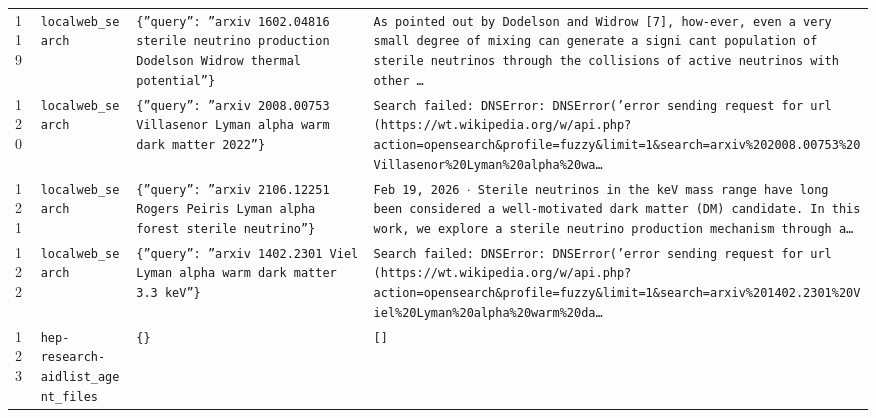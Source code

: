 \documentclass[11pt,a4paper]{article}
\begin{document}
\begin{longtable}{@{}p{}p{}p{}p{}@{}}
119 & \texttt{local}\newline\texttt{web\_\allowbreak{}search} & \texttt{\{''query'':\allowbreak{} ''arxiv 1602.04816 sterile neutrino production Dodelson Widrow thermal potential''\}\allowbreak{}} & \texttt{As pointed out by Dodelson and Widrow [7]\allowbreak{},\allowbreak{} how-ever,\allowbreak{} even a very small degree of mixing can generate a signi cant population of sterile neutrinos through the collisions of active neutrinos with other \ldots{}\allowbreak{}} \\
120 & \texttt{local}\newline\texttt{web\_\allowbreak{}search} & \texttt{\{''query'':\allowbreak{} ''arxiv 2008.00753 Villasenor Lyman alpha warm dark matter 2022''\}\allowbreak{}} & \texttt{Search failed:\allowbreak{} DNSError:\allowbreak{} DNSError('error sending request for url (https:\allowbreak{}/\allowbreak{}/\allowbreak{}wt.wikipedia.org/\allowbreak{}w/\allowbreak{}api.php?action=\allowbreak{}opensearch\&profile=\allowbreak{}fuzzy\&limit=\allowbreak{}1\&search=\allowbreak{}arxiv\%202008.00753\%20Villasenor\%20Lyman\%20alpha\%20wa\ldots{}\allowbreak{}} \\
121 & \texttt{local}\newline\texttt{web\_\allowbreak{}search} & \texttt{\{''query'':\allowbreak{} ''arxiv 2106.12251 Rogers Peiris Lyman alpha forest sterile neutrino''\}\allowbreak{}} & \texttt{Feb 19,\allowbreak{} 2026 $\cdot$ Sterile neutrinos in the keV mass range have long been considered a well-motivated dark matter (DM)\allowbreak{} candidate. In this work,\allowbreak{} we explore a sterile neutrino production mechanism through a\ldots{}\allowbreak{}} \\
122 & \texttt{local}\newline\texttt{web\_\allowbreak{}search} & \texttt{\{''query'':\allowbreak{} ''arxiv 1402.2301 Viel Lyman alpha warm dark matter 3.3 keV''\}\allowbreak{}} & \texttt{Search failed:\allowbreak{} DNSError:\allowbreak{} DNSError('error sending request for url (https:\allowbreak{}/\allowbreak{}/\allowbreak{}wt.wikipedia.org/\allowbreak{}w/\allowbreak{}api.php?action=\allowbreak{}opensearch\&profile=\allowbreak{}fuzzy\&limit=\allowbreak{}1\&search=\allowbreak{}arxiv\%201402.2301\%20Viel\%20Lyman\%20alpha\%20warm\%20da\ldots{}\allowbreak{}} \\
123 & \texttt{hep-research-aid}\newline\texttt{list\_\allowbreak{}agent\_\allowbreak{}files} & \texttt{\{\}\allowbreak{}} & \texttt{[]\allowbreak{}} \\

\end{longtable}
\end{document}
